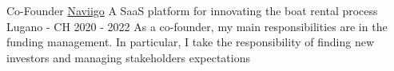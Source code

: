 
\begin{cventries}
  \cventry
    {Co-Founder} %
    {\href{https://www.naviigo.com}{Naviigo}} %
    {A SaaS platform for innovating the boat rental process}
    {Lugano - CH} %
    {2020 -  2022} %
    {
      As a co-founder, my main responsibilities are in the funding management. In particular, I take the responsibility of finding new investors and managing stakeholders expectations
    }
\end{cventries}
